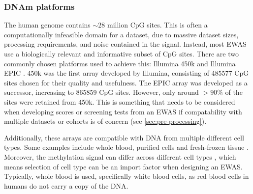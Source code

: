 \documentclass{article}
\begin{document}
\subsubsection{DNAm platforms}
The human genome contains \(\sim\!28\) million CpG sites. This is often a computationally infeasible domain for a dataset, due to massive dataset sizes, processing requirements, and noise contained in the signal. Instead, most EWAS use a biologically relevant and informative subset of CpG sites. There are two commonly chosen platforms used to achieve this: Illumina 450k \cite{illumina2012methylation450} and Illumina EPIC \cite{illumina2015methylationepic}. 450k was the first array developed by Illumina, consisting of \num{485577} CpG sites chosen for their quality and usefulness. The EPIC array was developed as a successor, increasing to \num{865859} CpG sites. However, only around \(>90\%\) of the sites were retained from 450k. This is something that needs to be considered when developing scores or screening tests from an EWAS if compatability with multiple datasets or cohorts is of concern (see \ref{sec:pre-processing}).

Additionally, these arrays are compatible with DNA from multiple different cell types. Some examples include whole blood, purified cells and fresh-frozen tissue \cite{bhat2022data}. Moreover, the methylation signal can differ across different cell types \cite{huang2016epigenome}, which means selection of cell type can be an import factor when designing an EWAS. Typically, whole blood is used, specifically white blood cells, as red blood cells in humans do not carry a copy of the DNA.

\end{document}
